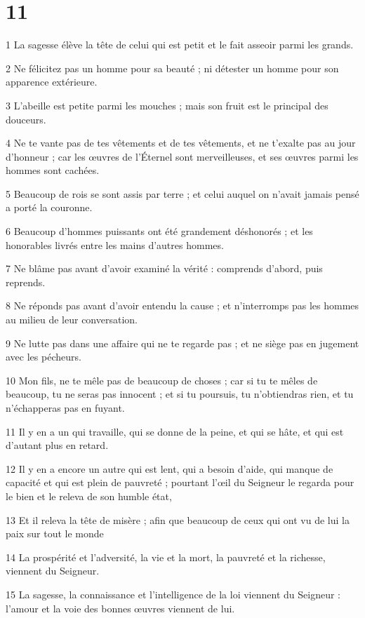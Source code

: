 \chapter{11}

\par 1 La sagesse élève la tête de celui qui est petit et le fait asseoir parmi les grands.
\par 2 Ne félicitez pas un homme pour sa beauté ; ni détester un homme pour son apparence extérieure.
\par 3 L'abeille est petite parmi les mouches ; mais son fruit est le principal des douceurs.
\par 4 Ne te vante pas de tes vêtements et de tes vêtements, et ne t'exalte pas au jour d'honneur ; car les œuvres de l'Éternel sont merveilleuses, et ses œuvres parmi les hommes sont cachées.
\par 5 Beaucoup de rois se sont assis par terre ; et celui auquel on n'avait jamais pensé a porté la couronne.
\par 6 Beaucoup d'hommes puissants ont été grandement déshonorés ; et les honorables livrés entre les mains d'autres hommes.
\par 7 Ne blâme pas avant d'avoir examiné la vérité : comprends d'abord, puis reprends.
\par 8 Ne réponds pas avant d'avoir entendu la cause ; et n'interromps pas les hommes au milieu de leur conversation.
\par 9 Ne lutte pas dans une affaire qui ne te regarde pas ; et ne siège pas en jugement avec les pécheurs.
\par 10 Mon fils, ne te mêle pas de beaucoup de choses ; car si tu te mêles de beaucoup, tu ne seras pas innocent ; et si tu poursuis, tu n'obtiendras rien, et tu n'échapperas pas en fuyant.
\par 11 Il y en a un qui travaille, qui se donne de la peine, et qui se hâte, et qui est d'autant plus en retard.
\par 12 Il y en a encore un autre qui est lent, qui a besoin d'aide, qui manque de capacité et qui est plein de pauvreté ; pourtant l'œil du Seigneur le regarda pour le bien et le releva de son humble état,
\par 13 Et il releva la tête de misère ; afin que beaucoup de ceux qui ont vu de lui la paix sur tout le monde
\par 14 La prospérité et l'adversité, la vie et la mort, la pauvreté et la richesse, viennent du Seigneur.
\par 15 La sagesse, la connaissance et l'intelligence de la loi viennent du Seigneur : l'amour et la voie des bonnes œuvres viennent de lui.
